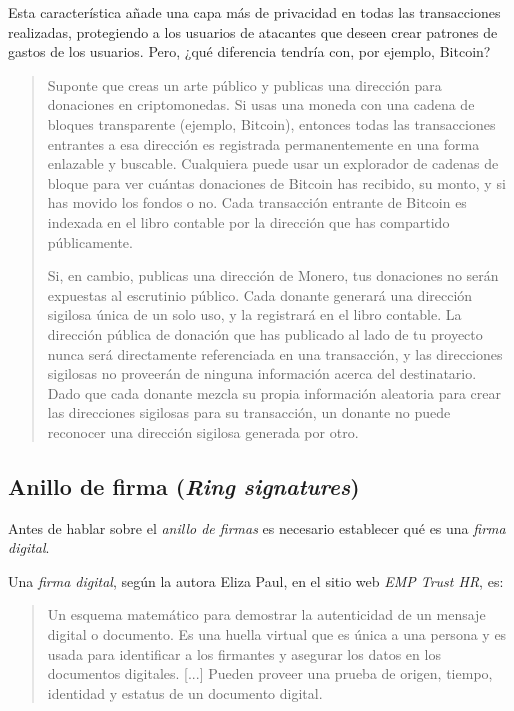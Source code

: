 \documentclass[12pt,a4paper,twoside]{book}
\begin{document}
Esta característica añade una capa más de privacidad en todas las transacciones realizadas, protegiendo a los usuarios de atacantes que deseen crear patrones de gastos de los usuarios. Pero, ¿qué diferencia tendría con, por ejemplo, Bitcoin?

\begin{quotation}
Suponte que creas un arte público y publicas una dirección para donaciones en criptomonedas. Si usas una moneda con una cadena de bloques transparente (ejemplo, Bitcoin), entonces todas las transacciones entrantes a esa dirección es registrada permanentemente en una forma enlazable y buscable. Cualquiera puede usar un explorador de cadenas de bloque para ver cuántas donaciones de Bitcoin has recibido, su monto, y si has movido los fondos o no. Cada transacción entrante de Bitcoin es indexada en el libro contable por la dirección que has compartido públicamente.

Si, en cambio, publicas una dirección de Monero, tus donaciones no serán expuestas al escrutinio público. Cada donante generará una dirección sigilosa única de un solo uso, y la registrará en el libro contable. La dirección pública de donación que has publicado al lado de tu proyecto nunca será directamente referenciada en una transacción, y las direcciones sigilosas no proveerán de ninguna información acerca del destinatario. Dado que cada donante mezcla su propia información aleatoria para crear las direcciones sigilosas para su transacción, un donante no puede reconocer una dirección sigilosa generada por otro. \cite[pág. 66]{monero:master}
\end{quotation}

\subsection{Anillo de firma (\textit{Ring signatures})}
Antes de hablar sobre el \textit{anillo de firmas} es necesario establecer qué es una \textit{firma digital}.

Una \textit{firma digital}, según la autora Eliza Paul, en el sitio web \textit{EMP Trust HR}, es:

\begin{quotation}
Un esquema matemático para demostrar la autenticidad de un mensaje digital o documento. Es una huella virtual que es única a una persona y es usada para identificar a los firmantes y asegurar los datos en los documentos digitales. [...] Pueden proveer una prueba de origen, tiempo, identidad y estatus de un documento digital. \cite{firmas-digitales}
\end{quotation}
\end{document}
